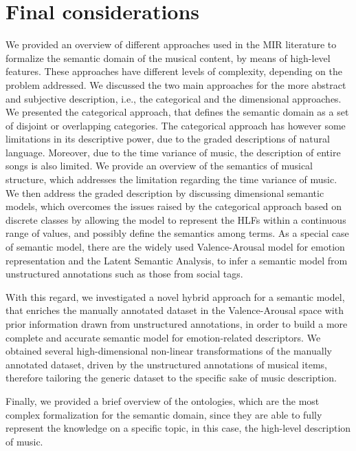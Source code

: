 \section{Final considerations}
We provided an overview of  different approaches used in the MIR literature to formalize the semantic domain of the musical content, by means of high-level features. These approaches have different levels of complexity, depending on the problem addressed. We discussed the two main approaches for the more abstract and subjective description, i.e., the categorical and the dimensional approaches. We presented the categorical approach, that defines the semantic domain as a set of disjoint or overlapping categories. The categorical approach has however some limitations in its descriptive power, due to the graded descriptions of natural language. Moreover, due to the time variance of music, the description of entire songs is also limited. We provide an overview of the semantics of musical structure, which addresses the limitation regarding the time variance of music. We then address the graded description by discussing dimensional semantic models,  which overcomes the issues raised by the categorical approach based on discrete classes by allowing the model to represent the HLFs within a continuous range of values, and possibly define the semantics among terms. As a special case of semantic model, there are the widely used Valence-Arousal model for emotion representation and the Latent Semantic Analysis, to infer a semantic model from unstructured annotations such as those from social tags. 

With this regard, we investigated a novel hybrid approach for a semantic model, that enriches the manually annotated dataset in the Valence-Arousal space with prior information drawn from unstructured annotations, in order to build a more complete and accurate semantic model for emotion-related descriptors. We obtained several high-dimensional non-linear transformations of the manually annotated dataset, driven by the unstructured annotations of musical items, therefore tailoring the generic dataset to the specific sake of music description. 

Finally, we provided a brief overview of the ontologies, which are the most complex formalization for the semantic domain, since they are able to fully represent the knowledge on a specific topic, in this case, the high-level description of music.
